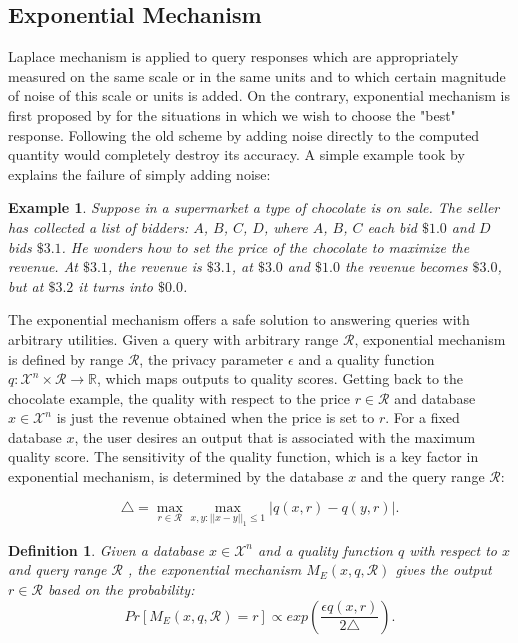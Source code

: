 \documentclass[a4paper, 11pt]{article} %
\newtheorem{definition}{Definition}[section]
\newtheorem{example}{Example}[section]
\begin{document}
\subsection{Exponential Mechanism}
Laplace mechanism is applied to query responses which are appropriately measured on the same scale or in the same units and to which certain magnitude of noise of this scale or units is added. On the contrary, exponential mechanism is first proposed by \cite{mcsherry2007mechanism} for the situations  in which we wish to choose the "best" response. Following the old scheme by adding noise directly to the computed quantity would completely destroy its accuracy. A simple example took by \cite{dwork2014algorithmic} explains the failure of simply adding noise:

\begin{example}
Suppose in a supermarket a type of chocolate is on sale. The seller has collected a list of bidders: $A$, $B$, $C$, $D$, where $A$, $B$, $C$ each bid $\$1.0$ and $D$ bids $\$3.1$. He wonders how to set the price of the chocolate to maximize the revenue. At $\$3.1$, the revenue is $\$3.1$, at $\$3.0$ and $\$1.0$ the revenue becomes $\$3.0$, but at $\$3.2$ it turns into $\$0.0$.
\end{example}

The exponential mechanism offers a safe solution to answering queries with arbitrary utilities. Given a query with arbitrary range $\mathcal{R}$, exponential mechanism is defined by range $\mathcal{R}$, the privacy parameter $\epsilon$ and a quality function $q:\mathcal{X}^n \times \mathcal{R} \rightarrow \mathbb{R}$, which maps outputs to quality scores. Getting back to the chocolate example, the quality with respect to the price $r\in \mathcal{R}$ and database $x \in  \mathcal{X}^n $ is just the revenue obtained when the price is set to $r$. For a fixed database $x$, the user desires an output that is associated with the maximum quality score. The sensitivity of the quality function, which is a key factor in exponential mechanism, is determined by the database $x$ and the query range $\mathcal{R}$:

\begin{equation}
\triangle = \max_{r \in \mathcal{R}} \max_{x,y:||x-y||_1 \leq 1} |q(x, r)-q(y,r)|.
\end{equation}

\begin{definition} 
Given a database $x \in  \mathcal{X}^n$ and a quality function $q$ with respect to $x$ and query range $\mathcal{R}$ , the exponential mechanism $M_E(x, q, \mathcal{R})$ gives the output $r \in \mathcal{R}$ based on the probability:
$$Pr[M_E(x, q, \mathcal{R}) = r] \propto exp(\frac{\epsilon q(x, r)}{2\triangle}).$$
\end{definition}
\end{document}
